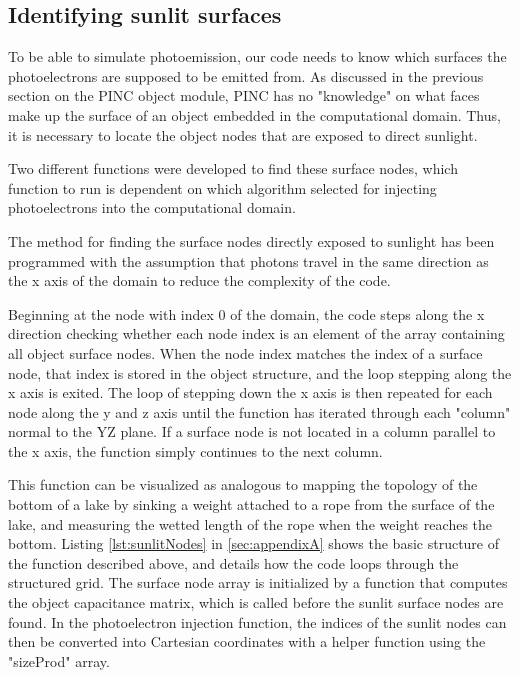 \subsection{Identifying sunlit surfaces}

To be able to simulate photoemission, our code needs to know which surfaces the photoelectrons are supposed to be emitted from. As discussed in the previous section on the PINC object module, PINC has no "knowledge" on what faces make up the surface of an object embedded in the computational domain. Thus, it is necessary to locate the object nodes that are exposed to direct sunlight.

Two different functions were developed to find these surface nodes, which function to run is dependent on which algorithm selected for injecting photoelectrons into the computational domain.

The method for finding the surface nodes directly exposed to sunlight has been programmed with the assumption that photons travel in the same direction as the x axis of the domain to reduce the complexity of the code. 

Beginning at the node with index 0 of the domain, the code steps along the x direction checking whether each node index is an element of the array containing all object surface nodes. When the node index matches the index of a surface node, that index is stored in the object structure, and the loop stepping along the x axis is exited. The loop of stepping down the x axis is then repeated for each node along the y and z axis until the function has iterated through each "column" normal to the YZ plane. If a surface node is not located in a column parallel to the x axis, the function simply continues to the next column.

This function can be visualized as analogous to mapping the topology of the bottom of a lake by sinking a weight attached to a rope from the surface of the lake, and measuring the wetted length of the rope when the weight reaches the bottom. Listing \ref{lst:sunlitNodes} in \cref{sec:appendixA} shows the basic structure of the function described above, and details how the code loops through the structured grid. The surface node array is initialized by a function that computes the object capacitance matrix, which is called before the sunlit surface nodes are found. In the photoelectron injection function, the indices of the sunlit nodes can then be converted into Cartesian coordinates with a helper function using the "sizeProd" array. 

